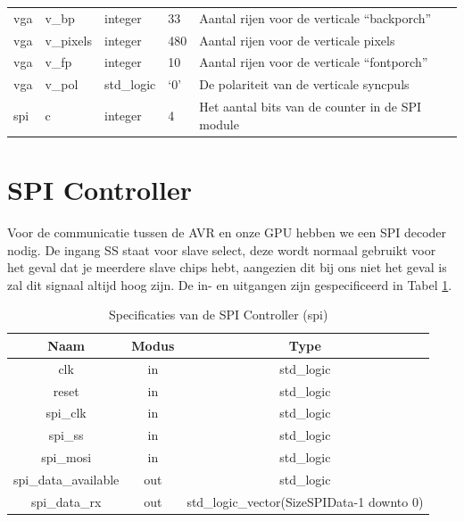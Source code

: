 \documentclass{scrartcl} %
\begin{document}
\begin{table}[H]
\begin{tabular}{l l l l l}
	vga & v\_bp & integer & 33 & Aantal rijen voor de verticale “backporch” \\ 
	vga & v\_pixels & integer & 480 & Aantal rijen voor de verticale pixels\\ 
	vga & v\_fp & integer & 10 & Aantal rijen voor de verticale “fontporch” \\ 
	vga & v\_pol & std\_logic & ‘0’ & De polariteit van de verticale syncpuls\\ 
	spi & c & integer & 4 & Het aantal bits van de counter in de SPI module\\
  	\hline
\end{tabular}
\end{table}

\section{SPI Controller}
Voor de communicatie tussen de AVR en onze GPU hebben we een SPI decoder nodig.
De ingang SS staat voor slave select, deze wordt normaal gebruikt voor het geval dat je meerdere slave chips hebt, aangezien dit bij ons niet het geval is zal dit signaal altijd hoog zijn.
De in- en uitgangen zijn gespecificeerd in Tabel \ref{tab:spec-spi}.

\begin{table}[H]
\centering
\caption{Specificaties van de SPI Controller (spi)}
\label{tab:spec-spi}
\begin{tabular}{c c c}
	\hline\hline
 	Naam & Modus & Type\\
 	\hline
	clk & in & std\_logic \\
	reset & in & std\_logic \\
	spi\_clk & in & std\_logic \\
	spi\_ss & in & std\_logic \\
	spi\_mosi & in & std\_logic \\
	spi\_data\_available & out & std\_logic \\
	spi\_data\_rx & out & std\_logic\_vector(SizeSPIData-1 downto 0) \\
  	\hline
\end{tabular}
\end{table}
\end{document}

